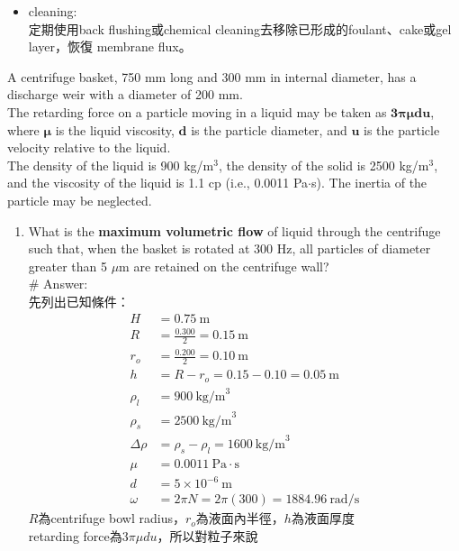 ﻿\documentclass[12pt,a4paper]{article}
\begin{document}
\begin{problems}
\begin{enumerate}
\begin{itemize}
  P.S. cross-flow 可以把膜表面附近累積的 solute 帶走，因此能減少cake buildup與concentration polarization。
  \item cleaning:\\
  定期使用back flushing或chemical cleaning去移除已形成的foulant、cake或gel layer，恢復 membrane flux。
\end{itemize}
\end{enumerate}
A centrifuge basket, 750 mm long and 300 mm in internal diameter,
has a discharge weir with a diameter of 200 mm.\\
The retarding force on a particle moving in a liquid may be taken as $\bm{3\pi\mu du}$,
where $\bm{\mu}$ is the liquid viscosity, 
$\bm{d}$ is the particle diameter, and $\bm{u}$ is the particle velocity relative to the liquid.\\
The density of the liquid is 900 kg/m$^3$, the density of the solid is 2500 kg/m$^3$, and the viscosity
of the liquid is 1.1 cp (i.e., 0.0011 Pa$\cdot$s). 
The inertia of the particle may be neglected.
\begin{enumerate}
  \item What is the \textbf{maximum volumetric flow} of liquid through the centrifuge such that,
  when the basket is rotated at 300 Hz,
  all particles of diameter greater than 5 $\mu$m are retained on the centrifuge wall?
  \\
  \# Answer:\\
  先列出已知條件：
  \begin{align}
    H &= 0.75~\text{m} \\
    R &= \frac{0.300}{2} = 0.15~\text{m} \\
    r_o &= \frac{0.200}{2} = 0.10~\text{m} \\
    h &= R-r_o = 0.15-0.10 = 0.05~\text{m} \\
    \rho_l &= 900~\text{kg/m}^3 \\
    \rho_s &= 2500~\text{kg/m}^3 \\
    \Delta\rho &= \rho_s-\rho_l = 1600~\text{kg/m}^3 \\
    \mu &= 0.0011~\text{Pa}\cdot\text{s} \\
    d &= 5\times 10^{-6}~\text{m} \\
    \omega &= 2\pi N = 2\pi(300) = 1884.96~\text{rad/s}
  \end{align}
  $R$為centrifuge bowl radius，$r_o$為液面內半徑，$h$為液面厚度\\
  retarding force為$3\pi\mu d u$，所以對粒子來說
  \begin{equation}

\end{equation}
\end{enumerate}
\end{problems}
\end{document}
